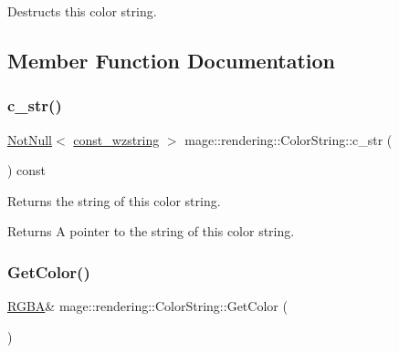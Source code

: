 Destructs this color string. 

\subsection{Member Function Documentation}
\mbox{\label{classmage_1_1rendering_1_1_color_string_a2706724097d2ad5c187d34db49d86bda}} 
\subsubsection{\texorpdfstring{c\+\_\+str()}{c\_str()}}
{\footnotesize\ttfamily \mbox{\hyperlink{namespacemage_a8769f9d670d6b585ea306cb1062af94b}{Not\+Null}}$<$ \mbox{\hyperlink{namespacemage_ac409e0f2a22292a3a4cd42742994fbf0}{const\+\_\+wzstring}} $>$ mage\+::rendering\+::\+Color\+String\+::c\+\_\+str (\begin{DoxyParamCaption}{ }\end{DoxyParamCaption}) const\hspace{0.3cm}{\ttfamily [noexcept]}}

Returns the string of this color string.

\begin{DoxyReturn}{Returns}
A pointer to the string of this color string. 
\end{DoxyReturn}
\mbox{\label{classmage_1_1rendering_1_1_color_string_a396ed7da3f3b27068b05c1ead9816046}} 
\subsubsection{\texorpdfstring{Get\+Color()}{GetColor()}\hspace{0.1cm}{\footnotesize\ttfamily [1/2]}}
{\footnotesize\ttfamily \mbox{\hyperlink{structmage_1_1_r_g_b_a}{R\+G\+BA}}\& mage\+::rendering\+::\+Color\+String\+::\+Get\+Color (\begin{DoxyParamCaption}{ }\end{DoxyParamCaption})\hspace{0.3cm}{\ttfamily [noexcept]}}


